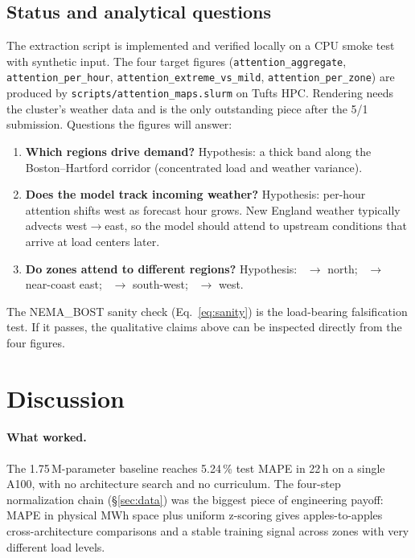 \documentclass[11pt,letterpaper]{article}
\begin{document}
\subsection{Status and analytical questions}

The extraction script is implemented and verified locally on a CPU smoke test with synthetic input. The four target figures (\texttt{attention\_aggregate}, \texttt{attention\_per\_hour}, \texttt{attention\_extreme\_vs\_mild}, \texttt{attention\_per\_zone}) are produced by \texttt{scripts/attention\_maps.slurm} on Tufts HPC. Rendering needs the cluster's weather data and is the only outstanding piece after the 5/1 submission. Questions the figures will answer:
\begin{enumerate}
  \item \textbf{Which regions drive demand?} Hypothesis: a thick band along the Boston--Hartford corridor (concentrated load and weather variance).
  \item \textbf{Does the model track incoming weather?} Hypothesis: per-hour attention shifts west as forecast hour grows. New England weather typically advects west$\to$east, so the model should attend to upstream conditions that arrive at load centers later.
  \item \textbf{Do zones attend to different regions?} Hypothesis: ~$\to$ north; ~$\to$ near-coast east; ~$\to$ south-west; ~$\to$ west.
\end{enumerate}
The NEMA\_BOST sanity check (Eq.~\eqref{eq:sanity}) is the load-bearing falsification test. If it passes, the qualitative claims above can be inspected directly from the four figures.

\section{Discussion}
\label{sec:discussion}

\paragraph{What worked.} The 1.75\,M-parameter baseline reaches 5.24\,\% test MAPE in 22\,h on a single A100, with no architecture search and no curriculum. The four-step normalization chain (\S\ref{sec:data}) was the biggest piece of engineering payoff: MAPE in physical MWh space plus uniform z-scoring gives apples-to-apples cross-architecture comparisons and a stable training signal across zones with very different load levels.
\end{document}
